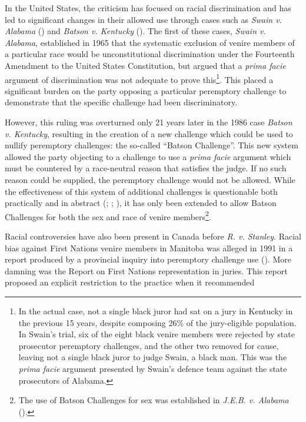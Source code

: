 In the United States, the criticism has focused on racial discrimination and has led to significant changes in their allowed use
through cases such as \textit{Swain v. Alabama} (\cite{swainvalabama}) and \textit{Batson v. Kentucky}
(\cite{batsonvkentucky}). The first of these cases, \textit{Swain v. Alabama}, established in 1965 that the systematic exclusion
of venire members of a particular race would be unconstitutional discrimination under the Fourteenth Amendment to the United
States Constitution, but argued that a \textit{prima facie} argument of discrimination was not adequate to prove this\footnote{In the actual case, not a single
  black juror had sat on a jury in Kentucky in the previous 15 years,
  despite composing 26\% of the jury-eligible population. In Swain's trial, six of the eight black venire members were rejected by
  state prosecutor peremptory challenges, and the other two removed for cause, leaving not a single black juror to judge Swain, a
  black man. This was the \textit{prima facie} argument presented by Swain's defence team against the state prosecutors of Alabama.}. This placed a significant burden on the party opposing a
particular peremptory challenge to demonstrate that the specific challenge had been discriminatory.

However, this ruling was overturned only 21 years later in the 1986 case \textit{Batson v. Kentucky}, resulting in the creation of a new challenge which
could be used to nullify peremptory challenges: the so-called ``Batson Challenge''. This new system allowed the
party objecting to a challenge to use a \textit{prima facie} argument which must be countered by a race-neutral reason that
satisfies the judge. If no such reason could be supplied, the peremptory challenge would not be allowed. While the
effectiveness of this system of additional challenges is questionable both practically and in abstract (\cite{page2005};
\cite{morehead1994}; \cite{hoffman1997}), it has only been extended to allow Batson
Challenges for both the sex and race of venire members\footnote{The use of Batson Challenges for sex was established in
  \textit{J.E.B. v. Alabama} (\cite{jebvalabama}).}.

Racial controversies have also been present in Canada before \textit{R. v. Stanley}. Racial bias against First Nations
venire members in Manitoba was alleged in 1991 in a report produced by a provincial inquiry into peremptory challenge use (\cite{goodfirststep}). More damning was the \citeauthor{iacobuccireport} Report on First Nations representation in
juries. This report proposed an explicit restriction to the practice when it recommended

